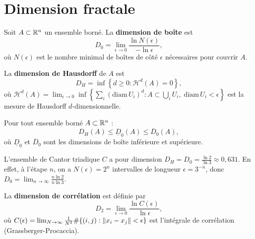 \section{Dimension fractale}

\begin{definition}
Soit $A \subset \mathbb{R}^n$ un ensemble born\'e. La \textbf{dimension de bo\^ite} est
\[
    D_0 = \lim_{\epsilon \to 0} \frac{\ln N(\epsilon)}{-\ln \epsilon},
\]
o\`u $N(\epsilon)$ est le nombre minimal de bo\^ites de c\^ot\'e $\epsilon$
n\'ecessaires pour couvrir $A$.
\end{definition}

\begin{definition}
La \textbf{dimension de Hausdorff} de $A$ est
\[
    D_H = \inf\left\{ d \geq 0 : \mathcal{H}^d(A) = 0 \right\},
\]
o\`u $\mathcal{H}^d(A) = \lim_{\epsilon \to 0} \inf \left\{
\sum_{i} (\mathrm{diam}\, U_i)^d : A \subset \bigcup_i U_i, \;
\mathrm{diam}\, U_i < \epsilon \right\}$ est la mesure de Hausdorff
$d$-dimensionnelle.
\end{definition}

\begin{proposition}
Pour tout ensemble born\'e $A \subset \mathbb{R}^n$ :
\[
    D_H(A) \leq \underline{D}_0(A) \leq \overline{D}_0(A),
\]
o\`u $\underline{D}_0$ et $\overline{D}_0$ sont les dimensions de bo\^ite
inf\'erieure et sup\'erieure.
\end{proposition}

\begin{exemple}
L'ensemble de Cantor triadique $C$ a pour dimension
$D_H = D_0 = \frac{\ln 2}{\ln 3} \approx 0{,}631$.
En effet, \`a l'\'etape $n$, on a $N(\epsilon) = 2^n$ intervalles de longueur
$\epsilon = 3^{-n}$, donc $D_0 = \lim_{n \to \infty} \frac{n \ln 2}{n \ln 3}$.
\end{exemple}

\begin{definition}
La \textbf{dimension de corr\'elation} est d\'efinie par
\[
    D_2 = \lim_{\epsilon \to 0} \frac{\ln C(\epsilon)}{\ln \epsilon},
\]
o\`u $C(\epsilon) = \lim_{N \to \infty} \frac{1}{N^2} \#\{(i, j) :
\left\| x_i - x_j \right\| < \epsilon\}$ est l'int\'egrale de corr\'elation
(Grassberger-Procaccia).
\end{definition}


